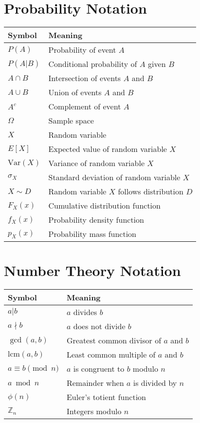 \section{Probability Notation}

\begin{tabular}{|l|l|}
\hline
\textbf{Symbol} & \textbf{Meaning} \\
\hline
$P(A)$ & Probability of event $A$ \\
$P(A|B)$ & Conditional probability of $A$ given $B$ \\
$A \cap B$ & Intersection of events $A$ and $B$ \\
$A \cup B$ & Union of events $A$ and $B$ \\
$A^c$ & Complement of event $A$ \\
$\Omega$ & Sample space \\
$X$ & Random variable \\
$E[X]$ & Expected value of random variable $X$ \\
$\text{Var}(X)$ & Variance of random variable $X$ \\
$\sigma_X$ & Standard deviation of random variable $X$ \\
$X \sim D$ & Random variable $X$ follows distribution $D$ \\
$F_X(x)$ & Cumulative distribution function \\
$f_X(x)$ & Probability density function \\
$p_X(x)$ & Probability mass function \\
\hline
\end{tabular}

\section{Number Theory Notation}

\begin{tabular}{|l|l|}
\hline
\textbf{Symbol} & \textbf{Meaning} \\
\hline
$a | b$ & $a$ divides $b$ \\
$a \nmid b$ & $a$ does not divide $b$ \\
$\gcd(a, b)$ & Greatest common divisor of $a$ and $b$ \\
$\text{lcm}(a, b)$ & Least common multiple of $a$ and $b$ \\
$a \equiv b \pmod{n}$ & $a$ is congruent to $b$ modulo $n$ \\
$a \bmod n$ & Remainder when $a$ is divided by $n$ \\
$\phi(n)$ & Euler's totient function \\
$\mathbb{Z}_n$ & Integers modulo $n$ \\
\hline
\end{tabular}

